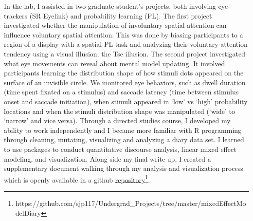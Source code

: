 \documentclass[12pt]{article}
\begin{document}
In the lab, I assisted in two graduate student's projects, both involving eye-trackers (SR Eyelink) and probability learning (PL). The first project investigated whether the manipulation of involuntary spatial attention can influence voluntary spatial attention. This was done by biasing participants to a region of a display with a spatial PL task and analyzing their voluntary attention tendency using a visual illusion; the Tse illusion. The second project investigated what eye movements can reveal about mental model updating. It involved participants learning the distribution shape of how stimuli dots appeared on the surface of an invisible circle. We monitored eye behaviors, such as dwell duration (time spent fixated on a stimulus) and saccade latency (time between stimulus onset and saccade initiation), when stimuli appeared in `low' vs `high' probability locations and when the stimuli distribution shape was manipulated (`wide' to `narrow' and vice versa). Through a directed studies course, I developed my ability to work independently and I became more familiar with R programming through cleaning, mutating, visualizing and analyzing a diary data set. I learned to use packages to conduct quantitative discourse analysis, linear mixed effect modeling, and visualization. Along side my final write up, I created a supplementary document walking through my analysis and visualization process which is openly available in a github \href{https://github.com/sjp117/Undergrad_Projects/tree/master/mixedEffectModelDiary}{repository}\footnote{https://github.com/sjp117/Undergrad\_Projects/tree/master/mixedEffectModelDiary}.
\end{document}
